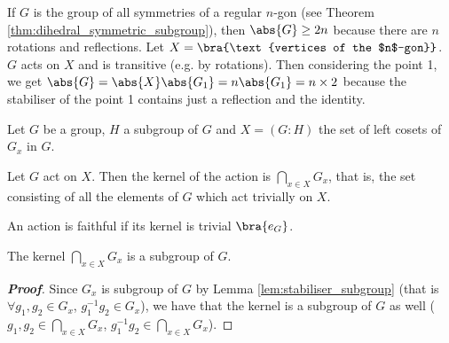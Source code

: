 \begin{example}
If $G$ is the group of all symmetries of a regular $n$-gon (see Theorem \ref{thm:dihedral_symmetric_subgroup}), then $\abs{G}\geq 2n$ because there are $n$ rotations and reflections. Let $X=\bra{\text{vertices of the $n$-gon}}$. $G$ acts on $X$ and is transitive (e.g. by rotations). Then considering the point 1, we get $\abs{G} = \abs{X}\abs{G_1} = n\abs{G_1} = n\times 2$ because the stabiliser of the point 1 contains just a reflection and the identity.
\end{example}

\begin{example}
Let $G$ be a group, $H$ a subgroup of $G$ and $X=(G:H)$ the set of left cosets of $G_x$ in $G$.
\end{example}



\begin{definition}[kernel]
Let $G$ act on $X$. Then the kernel of the action is $\bigcap_{x\in X}G_x$, that is, the set consisting of all the elements of $G$ which act trivially on $X$.

An action is faithful if its kernel is trivial $\bra{e_G}$.
\end{definition}

\begin{lemma}\label{lem:kernel_subgroup}
The kernel $\bigcap_{x\in X}G_x$ is a subgroup of $G$.
\end{lemma}

\begin{proof}[\bf Proof]
Since $G_x$ is subgroup of $G$ by Lemma \ref{lem:stabiliser_subgroup} (that is $\forall g_1,g_2\in G_x$, $g_1^{-1}g_2 \in G_x$), we have that the kernel is a subgroup of $G$ as well ($g_1,g_2\in \bigcap_{x\in X}G_x$, $g_1^{-1}g_2 \in \bigcap_{x\in X}G_x$).
\end{proof}


